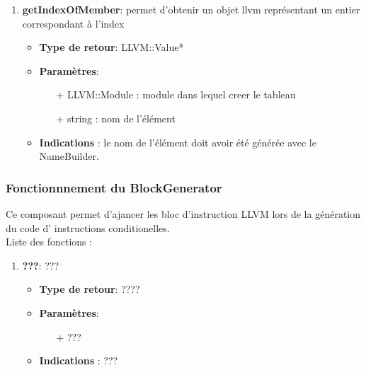 \documentclass{article}
\begin{document}
\begin{enumerate}
  \item \textbf{getIndexOfMember}: permet d'obtenir un objet llvm représentant un entier correspondant à l'index
    \begin{itemize}
    \item \textbf{Type de retour}: LLVM::Value*
    \item \textbf{Paramètres}:
    \begin{enumerate}
      \item[+] LLVM::Module : module dans lequel creer le tableau
      \item[+] string : nom de l'élément
    \end{enumerate}
    \item \textbf{Indications} : le nom de l'élément doit avoir été générée avec le NameBuilder.
  \end{itemize}

  \end{enumerate}

   \subsubsection{Fonctionnnement du BlockGenerator}

   Ce composant permet d'ajancer les bloc d'instruction LLVM lors de la génération du code d' instructions conditionelles.
   \\Liste des fonctions :\
  
  \begin{enumerate}
  \item \textbf{???}: ???
  \begin{itemize}
    \item \textbf{Type de retour}: ????
    \item \textbf{Paramètres}:
    \begin{enumerate}
      \item[+] ???
    \end{enumerate}
    \item \textbf{Indications} : ??? 
  \end{itemize} 
  \end{enumerate}

    
\end{document}
